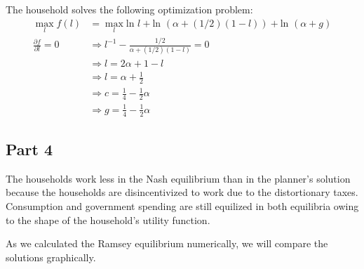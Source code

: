\documentclass[11pt]{article} %
\begin{document}
The household solves the following optimization problem:
\begin{align*}
\max_{l} f(l) &= \max_{l} \text{ln }l +\text{ln }(\alpha + (1/2) (1-l)) +\text{ln }(\alpha + g) \\
\frac{\partial f}{\partial l} = 0 &\Rightarrow l^{-1} -\frac{1/2}{\alpha + (1/2)(1-l)} = 0\\
&\Rightarrow l = 2\alpha + 1 - l \\
&\Rightarrow l = \alpha + \frac{1}{2}\\
&\Rightarrow c = \frac{1}{4} - \frac{1}{2}\alpha \\
&\Rightarrow g = \frac{1}{4} - \frac{1}{2}\alpha
\end{align*}

\subsection{Part 4}
The households work less in the Nash equilibrium than in the planner's solution because the households are disincentivized to work due to the distortionary taxes.  Consumption and government spending are still equilized in both equilibria owing to the shape of the household's utility function.

As we calculated the Ramsey equilibrium numerically, we will compare the solutions graphically.
\end{document}
